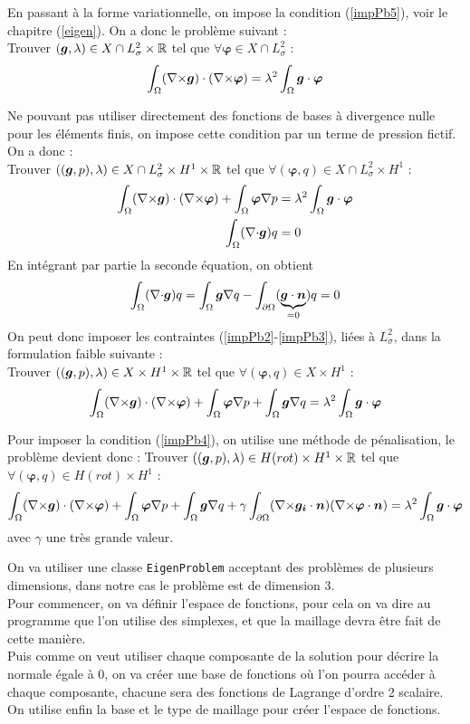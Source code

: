 En passant à la forme variationnelle, on impose la condition (\ref{impPb5}), voir le chapitre (\ref{eigen}). On a donc le problème suivant :\\
Trouver $(\bm{g},\lambda)\in X\cap L^2_\sigma\times{\mathbb{R}}$ tel que $\forall \bm{\varphi}\in X\cap L^2_\sigma$ :
\[
\int_\Omega ({\nabla\times}\bm{g})\cdot({\nabla\times}\bm{\varphi}) = \lambda^2\int_\Omega \bm{g}\cdot\bm{\varphi}
\]

Ne pouvant pas utiliser directement des fonctions de bases à divergence nulle pour les éléments finis, on impose cette condition par un terme de pression fictif. On a donc :\\
Trouver $((\bm{g},p),\lambda)\in X\cap L^2_\sigma \times H^1 \times {\mathbb{R}}$ tel que $\forall (\bm{\varphi},q)\in X\cap L^2_\sigma \times H^1$ :
\begin{align*}
\int_\Omega ({\nabla\times}\bm{g})\cdot({\nabla\times}\bm{\varphi}) + \int_\Omega\bm{\varphi}{\nabla} p &= \lambda^2\int_\Omega \bm{g}\cdot\bm{\varphi}\\
\int_\Omega ({\nabla\cdot}\bm{g}) q &= 0
\end{align*}
En intégrant par partie la seconde équation, on obtient
\[
\int_\Omega ({\nabla\cdot}\bm{g}) q = \int_\Omega \bm{g}{\nabla} q - \int_{\partial\Omega} (\underbrace{\bm{g}\cdot \bm{n}}_{=0})q = 0
\]
On peut donc imposer les contraintes (\ref{impPb2}-\ref{impPb3}), liées à $L^2_\sigma$, dans la formulation faible suivante :\\
Trouver $((\bm{g},p),\lambda)\in X \times H^1 \times {\mathbb{R}}$ tel que $\forall (\bm{\varphi},q)\in X \times H^1$ :
\[
\int_\Omega ({\nabla\times}\bm{g})\cdot({\nabla\times}\bm{\varphi}) + \int_\Omega\bm{\varphi}{\nabla} p + \int_\Omega \bm{g}{\nabla} q = \lambda^2\int_\Omega \bm{g}\cdot\bm{\varphi}
\]

Pour imposer la condition (\ref{impPb4}), on utilise une méthode de pénalisation, le problème devient donc :
Trouver $((\bm{g},p),\lambda)\in H(rot) \times H^1 \times {\mathbb{R}}$ tel que $\forall (\bm{\varphi},q)\in H(rot) \times H^1$ :
\[
\int_\Omega ({\nabla\times}\bm{g})\cdot({\nabla\times}\bm{\varphi}) + \int_\Omega\bm{\varphi}{\nabla} p + \int_\Omega \bm{g}{\nabla} q + \gamma\int_{\partial\Omega}({\nabla\times}\bm{g_i}\cdot\bm{n})({\nabla\times}\bm{\varphi}\cdot\bm{n}) = \lambda^2\int_\Omega \bm{g}\cdot\bm{\varphi}
\]
avec $\gamma$ une très grande valeur.


\iffalse

On va utiliser une classe \texttt{EigenProblem} acceptant des problèmes de plusieurs dimensions, dans notre cas le problème est de dimension 3.\\
Pour commencer, on va définir l'espace de fonctions, pour cela on va dire au programme que l'on utilise des simplexes, et que la maillage devra être fait de cette manière.\\
Puis comme on veut utiliser chaque composante de la solution pour décrire la normale égale à 0, on va créer une base de fonctions où l'on pourra accéder à chaque composante, chacune sera des fonctions de Lagrange d'ordre 2 scalaire.\\
On utilise enfin la base et le type de maillage pour créer l'espace de fonctions.

